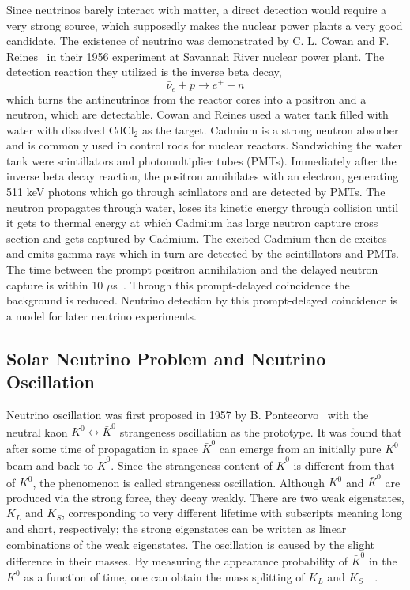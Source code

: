 Since neutrinos barely interact with matter, a direct detection would require a very strong source, which supposedly makes the nuclear power plants a very good candidate. The existence of neutrino was demonstrated by C. L. Cowan and F. Reines~\cite{Cowan1956} in their 1956 experiment at Savannah River nuclear power plant. The detection reaction they utilized is the inverse beta decay,
\begin{equation}
	\bar{\nu}_e+p\rightarrow e^++n
\end{equation}
which turns the antineutrinos from the reactor cores into a positron and a neutron, which are detectable. Cowan and Reines used a water tank filled with water with dissolved CdCl$_2$ as the target. Cadmium is a strong neutron absorber and is commonly used in control rods for nuclear reactors. Sandwiching the water tank were scintillators and photomultiplier tubes (PMTs). Immediately after the inverse beta decay reaction, the positron annihilates with an electron, generating 511 keV photons which go through scinllators and are detected by PMTs. The neutron propagates through water, loses its kinetic energy through collision until it gets to thermal energy at which Cadmium has large neutron capture cross section and gets captured by Cadmium. The excited Cadmium then de-excites and emits gamma rays which in turn are detected by the scintillators and PMTs. The time between the prompt positron annihilation and the delayed neutron capture is within 10 $\mu$s~\cite{Cowan1956}. Through this prompt-delayed coincidence the background is reduced. Neutrino detection by this prompt-delayed coincidence is a model for later neutrino experiments.

\subsection{Solar Neutrino Problem and Neutrino Oscillation}
Neutrino oscillation was first proposed in 1957 by B. Pontecorvo~\cite{Pontecorvo1957} with the neutral kaon $K^0\leftrightarrow\bar{K}^0$ strangeness oscillation as the prototype. It was found that after some time of propagation in space $\bar{K}^0$ can emerge from an initially pure $K^0$ beam and back to $\bar{K}^0$. Since the strangeness content of $\bar{K}^0$ is different from that of $K^0$, the phenomenon is called strangeness oscillation. Although $K^0$ and $\bar{K}^0$ are produced via the strong force, they decay weakly. There are two weak eigenstates, $K_L$ and $K_S$, corresponding to very different lifetime with subscripts meaning long and short, respectively; the strong eigenstates can be written as linear combinations of the weak eigenstates. The oscillation is caused by the slight difference in their masses. By measuring the appearance probability of $\bar{K}^0$ in the $K^0$ as a function of time, one can obtain the mass splitting of $K_L$ and $K_S$~\cite{Carithers1975}~\cite{Das2003}.

